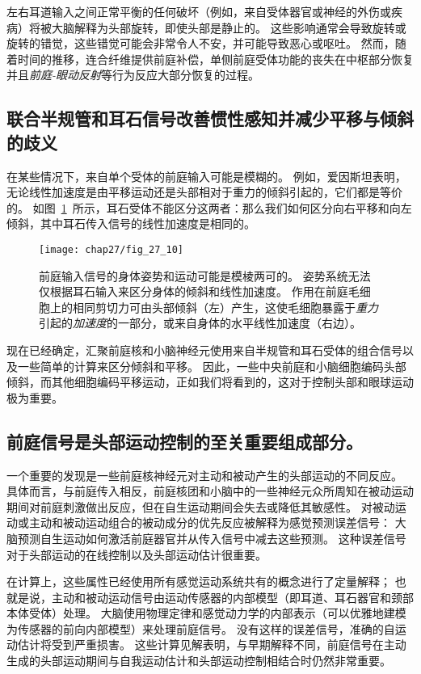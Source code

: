 左右耳道输入之间正常平衡的任何破坏（例如，来自受体器官或神经的外伤或疾病）将被大脑解释为头部旋转，即使头部是静止的。
这些影响通常会导致旋转或旋转的错觉，这些错觉可能会非常令人不安，并可能导致恶心或呕吐。
然而，随着时间的推移，连合纤维提供前庭补偿，单侧前庭受体功能的丧失在中枢部分恢复并且\textit{前庭-眼动反射}等行为反应大部分恢复的过程。



\subsection{联合半规管和耳石信号改善惯性感知并减少平移与倾斜的歧义}

在某些情况下，来自单个受体的前庭输入可能是模糊的。
例如，爱因斯坦\cite{einstein1908relativitatsprinzip}表明，无论线性加速度是由平移运动还是头部相对于重力的倾斜引起的，它们都是等价的。
如图~\ref{fig:27_10}~所示，耳石受体不能区分这两者：那么我们如何区分向右平移和向左倾斜，其中耳石传入信号的线性加速度是相同的。


\begin{figure}[htbp]
	\centering
	\texttt{[image: chap27/fig\_27\_10]}
	\caption{前庭输入信号的身体姿势和运动可能是模棱两可的。
		姿势系统无法仅根据耳石输入来区分身体的倾斜和线性加速度。
		作用在前庭毛细胞上的相同剪切力可由头部倾斜（左）产生，这使毛细胞暴露于\textit{重力}引起的\textit{加速度}的一部分，或来自身体的水平线性加速度（右边）。}
	\label{fig:27_10}
\end{figure}


现在已经确定，汇聚前庭核和小脑神经元使用来自半规管和耳石受体的组合信号以及一些简单的计算来区分倾斜和平移。
因此，一些中央前庭和小脑细胞编码头部倾斜，而其他细胞编码平移运动，正如我们将看到的，这对于控制头部和眼球运动极为重要。



\subsection{前庭信号是头部运动控制的至关重要组成部分。}

一个重要的发现是一些前庭核神经元对主动和被动产生的头部运动的不同反应。
具体而言，与前庭传入相反，前庭核团和小脑中的一些神经元众所周知在被动运动期间对前庭刺激做出反应，但在自生运动期间会失去或降低其敏感性。
对被动运动或主动和被动运动组合的被动成分的优先反应被解释为感觉预测误差信号：
大脑预测自生运动如何激活前庭器官并从传入信号中减去这些预测。
这种误差信号对于头部运动的在线控制以及头部运动估计很重要。


在计算上，这些属性已经使用所有感觉运动系统共有的概念进行了定量解释；
也就是说，主动和被动运动信号由运动传感器的内部模型（即耳道、耳石器官和颈部本体受体）处理。
大脑使用物理定律和感觉动力学的内部表示（可以优雅地建模为传感器的前向内部模型）来处理前庭信号。
没有这样的误差信号，准确的自运动估计将受到严重损害。
这些计算见解表明，与早期解释不同，前庭信号在主动生成的头部运动期间与自我运动估计和头部运动控制相结合时仍然非常重要。



